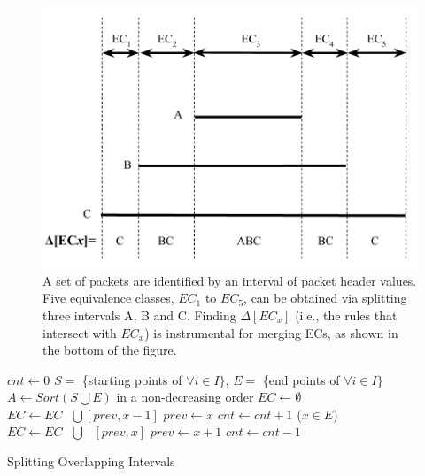 \begin{figure}[t]
\centering
\includegraphics[scale=.52]{figures/DisjointECs.pdf}
\caption{A set of packets are identified by an interval of packet header values.
        Five equivalence classes, $EC_1$ to $EC_5$, can be obtained via splitting three intervals A, B and C.
        Finding $\Delta[EC_x]$ (i.e., the rules that intersect with $EC_x$) is instrumental for
        merging ECs, as shown in the bottom of the figure.}
\label{Fig:DisjointECsAsInterval}
\end{figure}

\begin{algorithm}[t]
\DontPrintSemicolon
{}
 
$cnt \gets 0$\;
$S = $ \{starting points of $\forall i \in I\}$, $E = $ \{end points of $\forall i \in I\}$\;
$A \gets Sort(S \bigcup E)$ in a non-decreasing order\;
$EC \gets \emptyset$\;
 {
         {
                 {\label{Alg:LineEndStart1}
                        $EC \gets EC \text{ }\bigcup \text{} [prev, x-1]$\;
                }\label{Alg:LineEndStart2}
                $prev \gets x$\;\label{Alg:LineNewPrev1}
                $cnt \gets cnt + 1$\;
        }
        \Else ($x \in E$) {
                $EC \gets EC \text{ } \bigcup \text{ } [prev, x]$\;\label{Alg:LineEndEnd}
                $prev \gets x + 1$\;\label{Alg:LineNewPrev2}
                $cnt \gets cnt - 1$\;
        }
}
\caption{Splitting Overlapping Intervals}
\label{Alg:GenDisjointECs}
\end{algorithm}

